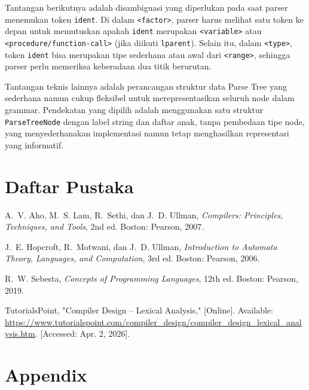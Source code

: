 ﻿\documentclass[12pt,a4paper]{article}
\begin{document}
Tantangan berikutnya adalah disambiguasi yang diperlukan pada saat
parser menemukan token \texttt{ident}. Di dalam \texttt{<factor>},
parser harus melihat satu token ke depan untuk memutuskan apakah
\texttt{ident} merupakan \texttt{<variable>} atau
\texttt{<procedure/function-call>} (jika diikuti \texttt{lparent}).
Selain itu, dalam \texttt{<type>}, token \texttt{ident} bisa merupakan tipe
sederhana atau awal dari \texttt{<range>}, sehingga parser perlu memeriksa
keberadaan dua titik berurutan.

Tantangan teknis lainnya adalah perancangan struktur data Parse Tree yang
sederhana namun cukup fleksibel untuk merepresentasikan seluruh node dalam
grammar. Pendekatan yang dipilih adalah menggunakan satu struktur
\texttt{ParseTreeNode} dengan label string dan daftar anak, tanpa pembedaan
tipe node, yang menyederhanakan implementasi namun tetap menghasilkan representasi
yang informatif.
\newpage
{}
\section*{Daftar Pustaka}

\begin{enumerate}[label={[\arabic*]}, leftmargin=2.5em, itemsep=0.3em]

\item A.~V. Aho, M.~S. Lam, R.~Sethi, dan J.~D. Ullman, \textit{Compilers: Principles, Techniques, and Tools}, 2nd ed. Boston: Pearson, 2007.

\item J.~E. Hopcroft, R.~Motwani, dan J.~D. Ullman, \textit{Introduction to Automata Theory, Languages, and Computation}, 3rd ed. Boston: Pearson, 2006.

\item R.~W. Sebesta, \textit{Concepts of Programming Languages}, 12th ed. Boston: Pearson, 2019.

\item TutorialsPoint, "Compiler Design -- Lexical Analysis," [Online]. Available: \url{https://www.tutorialspoint.com/compiler_design/compiler_design_lexical_analysis.htm}. [Accessed: Apr. 2, 2026].

\end{enumerate}


\section*{Appendix}
\end{document}
